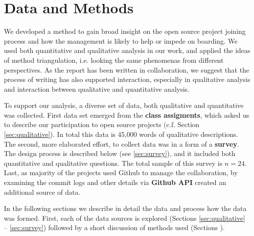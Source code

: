 \section{Data and Methods}

We developed a method to gain broad insight on the open source project joining process and how the management is likely to help or impede on boarding. We used both quantitative and qualitative analysis in our work, and applied the ideas of method triangulation, i.e. looking the same phenomenas from different perspectives. As the report has been written in collaboration, we suggest that the process of writing has also supported interaction, especially in qualitative analysis and interaction between qualitative and quantitative analysis.

To support our analysis, a diverse set of data, both qualitative and quantitative was collected. First data set emerged from the \textbf{class assigments}, which asked us to describe our participation to open source projects (c.f. Section \ref{sec:qualitative}). In total this data is 45,000 words of qualitative descriptions. The second, more elaborated effort, to collect data was in a form of a \textbf{survey}. The design process is described below (see \ref{sec:survey}), and it included both quantitative and qualitative questions. The total sample of this survey is $n=24$. Last, as majority of the projects used Github to manage the collaboration, by examining the commit logs and other details via \textbf{Github API} created an additional source of data.


In the following sections we describe in detail the data and process how the data was formed. First, each of the data sources is explored (Sections \ref{sec:qualitative} -- \ref{sec:survey}) followed by a short discussion of methods used (Sections ).

